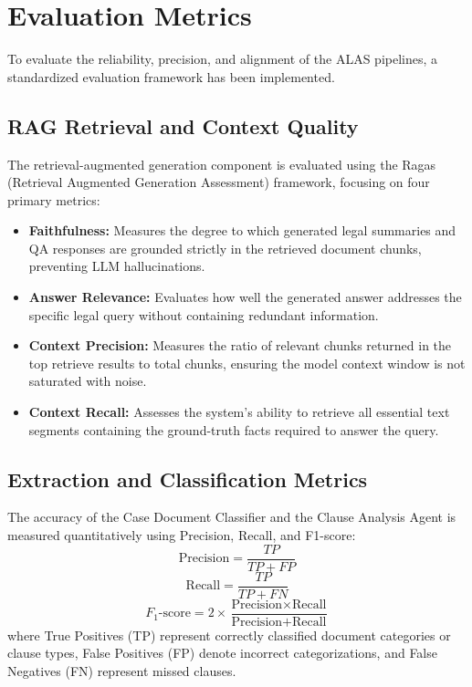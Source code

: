 \section{Evaluation Metrics}
To evaluate the reliability, precision, and alignment of the ALAS pipelines, a standardized evaluation framework has been implemented.

\subsection{RAG Retrieval and Context Quality}
The retrieval-augmented generation component is evaluated using the Ragas (Retrieval Augmented Generation Assessment) framework, focusing on four primary metrics:
\begin{itemize}
\item \textbf{Faithfulness:} Measures the degree to which generated legal summaries and QA responses are grounded strictly in the retrieved document chunks, preventing LLM hallucinations.
\item \textbf{Answer Relevance:} Evaluates how well the generated answer addresses the specific legal query without containing redundant information.
\item \textbf{Context Precision:} Measures the ratio of relevant chunks returned in the top retrieve results to total chunks, ensuring the model context window is not saturated with noise.
\item \textbf{Context Recall:} Assesses the system's ability to retrieve all essential text segments containing the ground-truth facts required to answer the query.
\end{itemize}

\subsection{Extraction and Classification Metrics}
The accuracy of the Case Document Classifier and the Clause Analysis Agent is measured quantitatively using Precision, Recall, and F1-score:
\begin{equation}
\text{Precision} = \frac{TP}{TP + FP}
\end{equation}
\begin{equation}
\text{Recall} = \frac{TP}{TP + FN}
\end{equation}
\begin{equation}
F_1\text{-score} = 2 \times \frac{\text{Precision} \times \text{Recall}}{\text{Precision} + \text{Recall}}
\end{equation}
where True Positives (TP) represent correctly classified document categories or clause types, False Positives (FP) denote incorrect categorizations, and False Negatives (FN) represent missed clauses.

